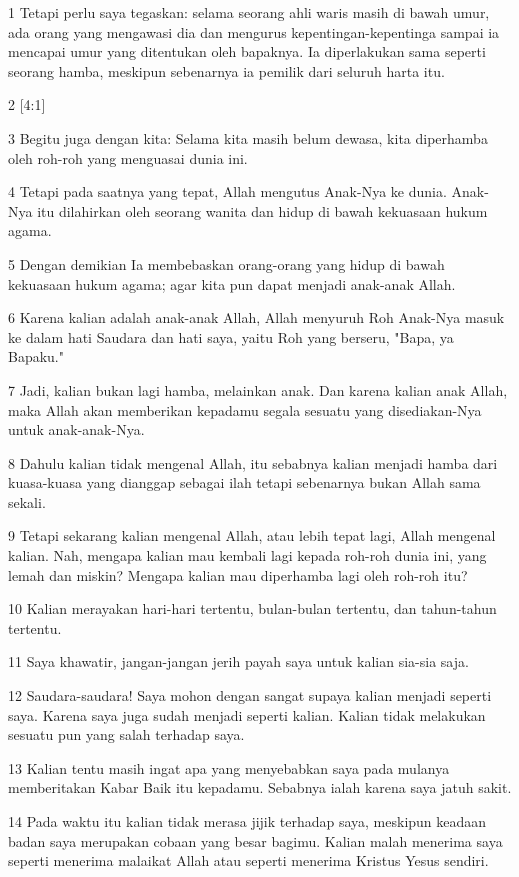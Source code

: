 \par 1 Tetapi perlu saya tegaskan: selama seorang ahli waris masih di bawah umur, ada orang yang mengawasi dia dan mengurus kepentingan-kepentinga sampai ia mencapai umur yang ditentukan oleh bapaknya. Ia diperlakukan sama seperti seorang hamba, meskipun sebenarnya ia pemilik dari seluruh harta itu.
\par 2 [4:1]
\par 3 Begitu juga dengan kita: Selama kita masih belum dewasa, kita diperhamba oleh roh-roh yang menguasai dunia ini.
\par 4 Tetapi pada saatnya yang tepat, Allah mengutus Anak-Nya ke dunia. Anak-Nya itu dilahirkan oleh seorang wanita dan hidup di bawah kekuasaan hukum agama.
\par 5 Dengan demikian Ia membebaskan orang-orang yang hidup di bawah kekuasaan hukum agama; agar kita pun dapat menjadi anak-anak Allah.
\par 6 Karena kalian adalah anak-anak Allah, Allah menyuruh Roh Anak-Nya masuk ke dalam hati Saudara dan hati saya, yaitu Roh yang berseru, "Bapa, ya Bapaku."
\par 7 Jadi, kalian bukan lagi hamba, melainkan anak. Dan karena kalian anak Allah, maka Allah akan memberikan kepadamu segala sesuatu yang disediakan-Nya untuk anak-anak-Nya.
\par 8 Dahulu kalian tidak mengenal Allah, itu sebabnya kalian menjadi hamba dari kuasa-kuasa yang dianggap sebagai ilah tetapi sebenarnya bukan Allah sama sekali.
\par 9 Tetapi sekarang kalian mengenal Allah, atau lebih tepat lagi, Allah mengenal kalian. Nah, mengapa kalian mau kembali lagi kepada roh-roh dunia ini, yang lemah dan miskin? Mengapa kalian mau diperhamba lagi oleh roh-roh itu?
\par 10 Kalian merayakan hari-hari tertentu, bulan-bulan tertentu, dan tahun-tahun tertentu.
\par 11 Saya khawatir, jangan-jangan jerih payah saya untuk kalian sia-sia saja.
\par 12 Saudara-saudara! Saya mohon dengan sangat supaya kalian menjadi seperti saya. Karena saya juga sudah menjadi seperti kalian. Kalian tidak melakukan sesuatu pun yang salah terhadap saya.
\par 13 Kalian tentu masih ingat apa yang menyebabkan saya pada mulanya memberitakan Kabar Baik itu kepadamu. Sebabnya ialah karena saya jatuh sakit.
\par 14 Pada waktu itu kalian tidak merasa jijik terhadap saya, meskipun keadaan badan saya merupakan cobaan yang besar bagimu. Kalian malah menerima saya seperti menerima malaikat Allah atau seperti menerima Kristus Yesus sendiri.
